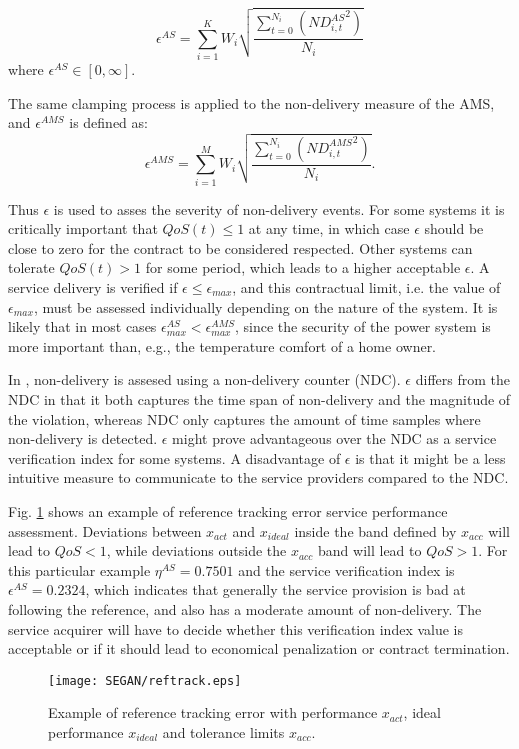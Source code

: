 \begin{equation}\label{eq:epsilonAS}
\epsilon^{AS} = \sum^{K}_{i=1} W_i \sqrt{\frac{\sum^{N_i}_{t=0} \left( {ND^{AS}_{i,t}}^{2} \right)}{N_i}}
\end{equation}
where $\epsilon^{AS} \in [0,\infty]$.

The same clamping process is applied to the non-delivery measure of the AMS, and $\epsilon^{AMS}$ is defined as:
\begin{equation}\label{eq:epsilonAMS}
\epsilon^{AMS} = \sum^{M}_{i=1} W_i \sqrt{\frac{\sum^{N_i}_{t=0} \left( {ND^{AMS}_{i,t}}^{2} \right)}{N_i}}.
\end{equation}

Thus $\epsilon$ is used to asses the severity of non-delivery events. For some systems it is critically important that $QoS(t)\leq1$ at any time, in which case $\epsilon$ should be close to zero for the contract to be considered respected. Other systems can tolerate $QoS(t)>1$ for some period, which leads to a higher acceptable $\epsilon$. A service delivery is verified if $\epsilon \leq \epsilon_{max}$, and this contractual limit, i.e. the value of $\epsilon_{max}$, must be assessed individually depending on the nature of the system. It is likely that in most cases $\epsilon^{AS}_{max}<\epsilon^{AMS}_{max}$, since the security of the power system is more important than, e.g., the temperature comfort of a home owner.

In \cite{bondy2014performance}, non-delivery is assesed using a non-delivery counter (NDC). $\epsilon$ differs from the NDC in that it both captures the time span of non-delivery and the magnitude of the violation, whereas NDC only captures the amount of time samples where non-delivery is detected. $\epsilon$ might prove advantageous over the NDC as a service verification index for some systems. A disadvantage of $\epsilon$ is that it might be a less intuitive measure to communicate to the service providers compared to the NDC.

Fig. \ref{fig:RefErr} shows an example of reference tracking error service performance assessment. Deviations between $x_{act}$ and $x_{ideal}$ inside the band defined by $x_{acc}$ will lead to $QoS<1$, while deviations outside the $x_{acc}$ band will lead to $QoS>1$. For this particular example $\eta^{AS}=0.7501$ and the service verification index is $\epsilon^{AS}=0.2324$, which indicates that generally the service provision is bad at following the reference, and also has a moderate amount of non-delivery. The service acquirer will have to decide whether this verification index value is acceptable or if it should lead to economical penalization or contract termination.

\begin{figure}
\centering
\texttt{[image: SEGAN/reftrack.eps]}
\caption{Example of reference tracking error with performance $x_{act}$, ideal performance $x_{ideal}$ and tolerance limits $x_{acc}$.}
\label{fig:RefErr}
\end{figure}
